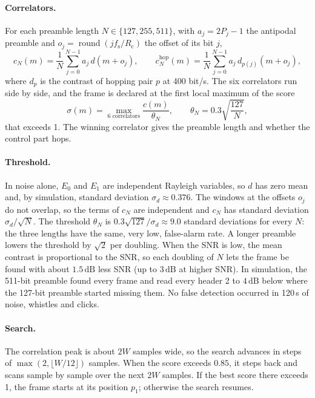 \documentclass[11pt,a4paper]{article}
\newcommand{\dB}{\,\mathrm{dB}}
\newcommand{\round}[1]{\operatorname{round}\!\left(#1\right)}
\newcommand{\fs}{f_{\mathrm{s}}}
\newcommand{\Rc}{R_{\mathrm{c}}}
\theoremstyle{remark}
\begin{document}
\paragraph{Correlators.}
For each preamble length $N \in \{127, 255, 511\}$, with $a_j = 2P_j - 1$ the antipodal preamble and $o_j = \round{j \fs / \Rc}$ the offset of its bit $j$,
\begin{equation}
c_N(m) = \frac1N \sum_{j=0}^{N-1} a_j\, d(m + o_j), \qquad
c^{\mathrm{hop}}_N(m) = \frac1N \sum_{j=0}^{N-1} a_j\, d_{p(j)}(m + o_j),
\end{equation}
where $d_p$ is the contrast of hopping pair $p$ at 400 bit/s. The six correlators run side by side, and the frame is declared at the first local maximum of the score
\begin{equation}
\sigma(m) = \max_{\text{6 correlators}} \frac{c(m)}{\theta_N}, \qquad \theta_N = 0.3\sqrt{\frac{127}{N}},
\end{equation}
that exceeds 1. The winning correlator gives the preamble length and whether the control part hops.

\paragraph{Threshold.}
In noise alone, $E_0$ and $E_1$ are independent Rayleigh variables, so $d$ has zero mean and, by simulation, standard deviation $\sigma_d \approx 0.376$. The windows at the offsets $o_j$ do not overlap, so the terms of $c_N$ are independent and $c_N$ has standard deviation $\sigma_d/\sqrt N$. The threshold $\theta_N$ is $0.3\sqrt{127}/\sigma_d \approx 9.0$ standard deviations for every $N$: the three lengths have the same, very low, false-alarm rate. A longer preamble lowers the threshold by $\sqrt 2$ per doubling. When the SNR is low, the mean contrast is proportional to the SNR, so each doubling of $N$ lets the frame be found with about $1.5\dB$ less SNR (up to $3\dB$ at higher SNR). In simulation, the 511-bit preamble found every frame and read every header 2 to $4\dB$ below where the 127-bit preamble started missing them. No false detection occurred in 120\,s of noise, whistles and clicks.

\paragraph{Search.}
The correlation peak is about $2W$ samples wide, so the search advances in steps of $\max(2, \lfloor W/12 \rfloor)$ samples. When the score exceeds $0.85$, it steps back and scans sample by sample over the next $2W$ samples. If the best score there exceeds 1, the frame starts at its position $p_1$; otherwise the search resumes.
\end{document}
